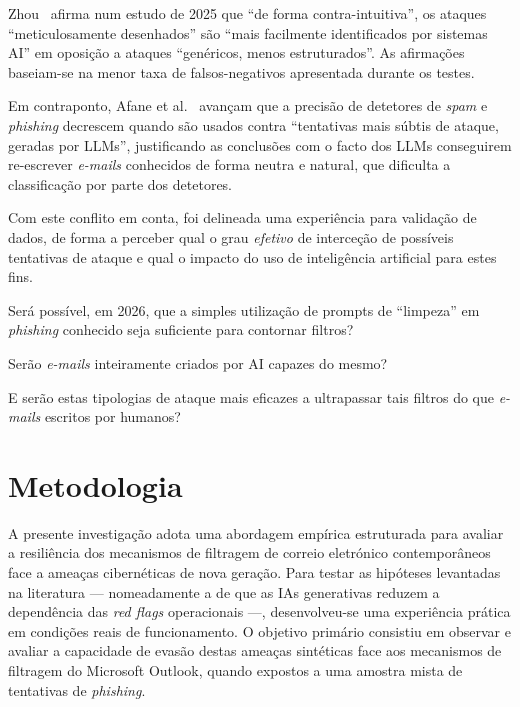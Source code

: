\documentclass[pdflatex,sn-mathphys-num]{sn-jnl}
\theoremstyle{thmstyleone}%
\theoremstyle{thmstyletwo}%
\theoremstyle{thmstylethree}%
\begin{document}
Zhou~\cite{bib10} afirma num estudo de 2025 que ``de forma contra-intuitiva'', os ataques ``meticulosamente desenhados'' são ``mais facilmente identificados por sistemas AI'' em oposição a ataques ``genéricos, menos estruturados''. As afirmações baseiam-se na menor taxa de falsos-negativos apresentada durante os testes.

Em contraponto, Afane et al.~\cite{bib11} avançam que a precisão de detetores de \textit{spam} e \textit{phishing} decrescem quando são usados contra ``tentativas mais súbtis de ataque, geradas por LLMs'', justificando as conclusões com o facto dos LLMs conseguirem re-escrever \textit{e-mails} conhecidos de forma neutra e natural, que dificulta a classificação por parte dos detetores.

Com este conflito em conta, foi delineada uma experiência para validação de dados, de forma a perceber qual o grau \textit{efetivo} de interceção de possíveis tentativas de ataque e qual o impacto do uso de inteligência artificial para estes fins.

Será possível, em 2026, que a simples utilização de prompts de ``limpeza'' em \textit{phishing} conhecido seja suficiente para contornar filtros?

Serão \textit{e-mails} inteiramente criados por AI capazes do mesmo? 

E serão estas tipologias de ataque mais eficazes a ultrapassar tais filtros do que \textit{e-mails} escritos por humanos? 




\section{Metodologia}\label{sec3}
A presente investigação adota uma abordagem empírica estruturada para avaliar a resiliência dos mecanismos de filtragem de correio eletrónico contemporâneos face a ameaças cibernéticas de nova geração. Para testar as hipóteses levantadas na literatura --- nomeadamente a de que as IAs generativas reduzem a dependência das \textit{red flags} operacionais ---, desenvolveu-se uma experiência prática em condições reais de funcionamento. O objetivo primário consistiu em observar e avaliar a capacidade de evasão destas ameaças sintéticas face aos mecanismos de filtragem do Microsoft Outlook, quando expostos a uma amostra mista de tentativas de \textit{phishing}.
\end{document}

